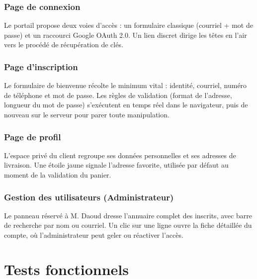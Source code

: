 \subsubsection{Page de connexion}


Le portail propose deux voies d'accès : un formulaire classique (courriel + mot de passe) et un raccourci Google OAuth 2.0. Un lien discret dirige les têtes en l'air vers le procédé de récupération de clés.

\subsubsection{Page d'inscription}


Le formulaire de bienvenue récolte le minimum vital : identité, courriel, numéro de téléphone et mot de passe. Les règles de validation (format de l'adresse, longueur du mot de passe) s'exécutent en temps réel dans le navigateur, puis de nouveau sur le serveur pour parer toute manipulation.

\subsubsection{Page de profil}


L'espace privé du client regroupe ses données personnelles et ses adresses de livraison. Une étoile jaune signale l'adresse favorite, utilisée par défaut au moment de la validation du panier.

\subsubsection{Gestion des utilisateurs (Administrateur)}


Le panneau réservé à M. Daoud dresse l'annuaire complet des inscrits, avec barre de recherche par nom ou courriel. Un clic sur une ligne ouvre la fiche détaillée du compte, où l'administrateur peut geler ou réactiver l'accès.

\section{Tests fonctionnels}


